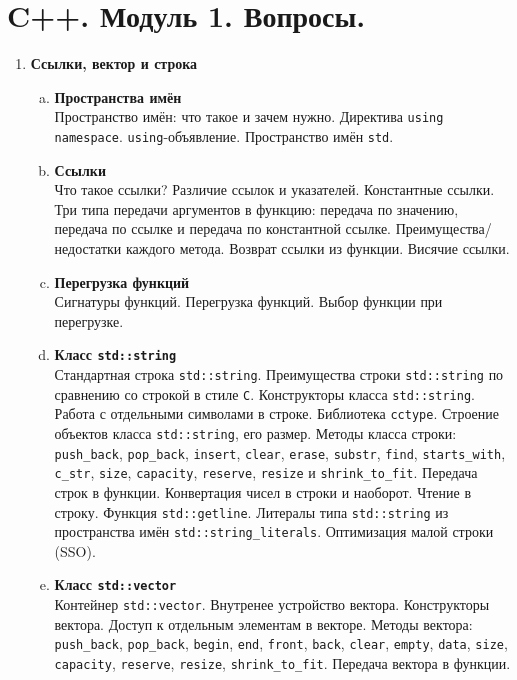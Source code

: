 \documentclass{article}
\begin{document}

\section*{C++. Модуль 1. Вопросы.}


\begin{enumerate}
\item \textbf{Ссылки, вектор и строка}

\begin{enumerate}[a.]
\item \textbf{Пространства имён}\\
Пространство имён: что такое и зачем нужно. Директива \texttt{using namespace}. \texttt{using}-объявление.
Пространство имён \texttt{std}.

\item \textbf{Ссылки}\\
Что такое ссылки? Различие ссылок и указателей. Константные ссылки. Три типа передачи аргументов в функцию: передача по значению, передача по ссылке и передача по константной ссылке. Преимущества/недостатки каждого метода. Возврат ссылки из функции. Висячие ссылки.

\item  \textbf{Перегрузка функций}\\
Сигнатуры функций. Перегрузка функций. Выбор функции при перегрузке.


\item \textbf{Класс \texttt{std::string}}\\
Стандартная строка \texttt{std::string}. Преимущества строки \texttt{std::string} по сравнению со строкой в стиле \texttt{C}. Конструкторы класса \texttt{std::string}. Работа с отдельными символами в строке. Библиотека \texttt{cctype}. Строение объектов класса \texttt{std::string}, его размер.  Методы класса строки: \texttt{push\_back}, \texttt{pop\_back}, \texttt{insert}, \texttt{clear}, \texttt{erase}, \texttt{substr}, \texttt{find}, \texttt{starts\_with},  \texttt{c\_str}, \texttt{size}, \texttt{capacity}, \texttt{reserve}, \texttt{resize} и \texttt{shrink\_to\_fit}. Передача строк в функции. Конвертация чисел в строки и наоборот. Чтение в строку. Функция \texttt{std::getline}. Литералы типа \texttt{std::string} из пространства имён \texttt{std::string\_literals}. Оптимизация малой строки (SSO).


\item \textbf{Класс \texttt{std::vector}}\\
Контейнер \texttt{std::vector}. Внутренее устройство вектора. Конструкторы вектора. Доступ к отдельным элементам в векторе. Методы вектора: \texttt{push\_back}, \texttt{pop\_back}, \texttt{begin}, \texttt{end}, \texttt{front}, \texttt{back}, \texttt{clear}, \texttt{empty}, \texttt{data}, \texttt{size}, \texttt{capacity}, \texttt{reserve}, \texttt{resize}, \texttt{shrink\_to\_fit}. Передача вектора в функции.



\end{enumerate}
\end{enumerate}
\end{document}
